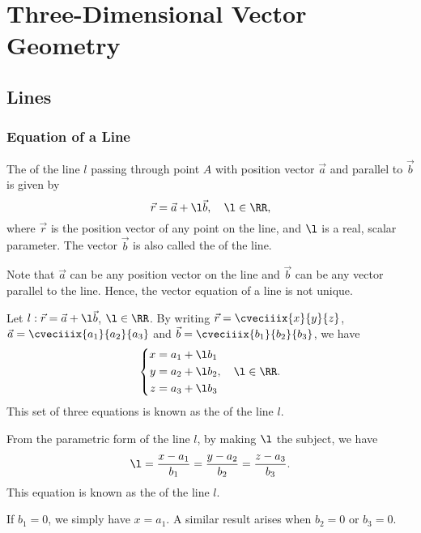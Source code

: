 \chapter{Three-Dimensional Vector Geometry}

\section{Lines}

\subsection{Equation of a Line}

\begin{definition}
    The  of the line $l$ passing through point $A$ with position vector $\vec a$ and parallel to $\vec b$ is given by \[\vec r = \vec a + \l \vec b, \quad \l \in \RR,\] where $\vec r$ is the position vector of any point on the line, and $\l$ is a real, scalar parameter. The vector $\vec b$ is also called the  of the line.
\end{definition}
\begin{remark}
    Note that $\vec a$ can be any position vector on the line and $\vec b$ can be any vector parallel to the line. Hence, the vector equation of a line is not unique.
\end{remark}

\begin{definition}
    Let $l : \vec r = \vec a + \l \vec b$, $\l \in \RR$. By writing $\vec r = \cveciiix{x}{y}{z}$, $\vec a = \cveciiix{a_1}{a_2}{a_3}$ and $\vec b = \cveciiix{b_1}{b_2}{b_3}$, we have \[\left\{ \begin{aligned}
        x = a_1 + \l b_1\\
        y = a_2 + \l b_2\\
        z = a_3 + \l b_3
    \end{aligned}, \quad \l \in \RR. \right.\] This set of three equations is known as the  of the line $l$.
\end{definition}

\begin{definition}
    From the parametric form of the line $l$, by making $\l$ the subject, we have \[\l = \frac{x-a_1}{b_1} = \frac{y - a_2}{b_2} = \frac{z - a_3}{b_3}.\] This equation is known as the  of the line $l$.
\end{definition}
\begin{remark}
    If $b_1 = 0$, we simply have $x = a_1$. A similar result arises when $b_2 = 0$ or $b_3 = 0$.
\end{remark}

